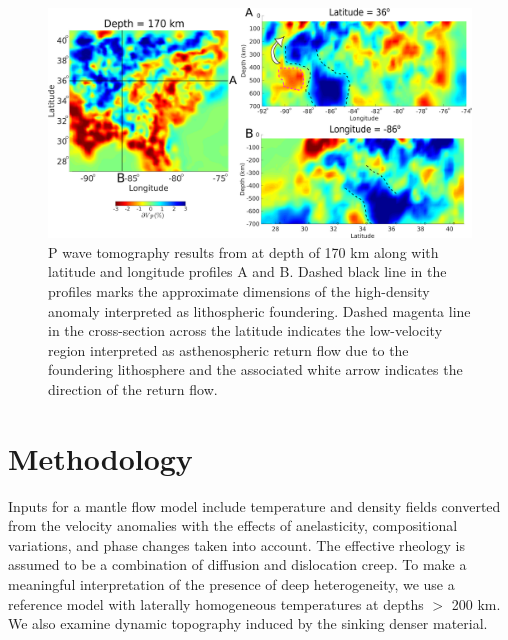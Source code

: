 \documentclass[draft,linenumbers]{agujournal2018}
\begin{document}
\begin{figure}[ht]
    \centering
    \includegraphics[width=\linewidth]{figures/figure_tomography.png}
    \caption{P wave tomography results from \citep{Biryol_2016} at depth of 170 km along with latitude and longitude profiles A and B. Dashed black line in the profiles marks the approximate dimensions of the high-density anomaly interpreted as lithospheric foundering. Dashed magenta line in the cross-section across the latitude indicates the low-velocity region interpreted as asthenospheric return flow due to the foundering lithosphere and the associated white arrow indicates the direction of the return flow.}
    \label{fig_tomo}
 \end{figure}

\section{Methodology}
    Inputs for a mantle flow model include temperature and density fields converted from the velocity anomalies with the effects of anelasticity, compositional variations, and phase changes taken into account. The effective rheology is assumed to be a combination of diffusion and dislocation creep. To make a meaningful interpretation of the presence of deep heterogeneity, we use a reference model with laterally homogeneous temperatures at depths $>$ 200 km.   We also examine dynamic topography induced by the sinking denser material. 
    
\end{document}

